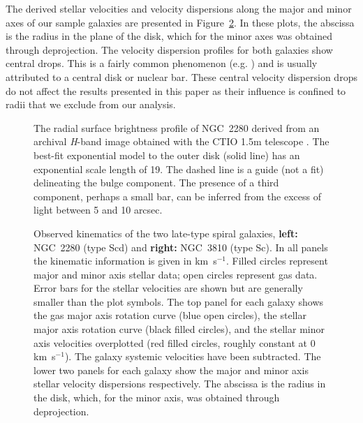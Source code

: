 \documentclass[useAMS,usenatbib]{mn2e}
\newcommand{\kms}{km~s$^{-1}$}
\begin{document}
The derived stellar velocities and velocity dispersions along the
major and minor axes of our sample galaxies are presented in
Figure~\ref{f:fig2}.  In these plots, the abscissa is the radius in
the plane of the disk, which for the minor axes was obtained through
deprojection.  The velocity dispersion profiles for both galaxies show
central drops.  This is a fairly common phenomenon
(e.g. \citealt{Comeron2008}) and is usually attributed to a central disk or
nuclear bar.  These central velocity dispersion drops do not affect
the results presented in this paper as their influence is confined to
radii that we exclude from our analysis.

\begin{figure}
   \centerline{}
   \caption{ The radial surface brightness profile of NGC~2280 derived
     from an archival {\it H}-band image obtained with the CTIO 1.5m
     telescope \citep{Eskridge2002}.  The best-fit exponential model to
     the outer disk (solid line) has an exponential scale length of
     19\arcsec. The dashed line is a guide (not a fit) delineating the
     bulge component. The presence of a third component, perhaps a small
     bar, can be inferred from the excess of light between 5 and 10
     arcsec.
\label{f:fig1}}
\end{figure}

\begin{figure}
   \centerline{}
   \caption{Observed kinematics of the two late-type spiral galaxies,
     {\bf left:} NGC~2280 (type Scd) and {\bf right:} NGC~3810 (type
     Sc).  In all panels the kinematic information is given in \kms.
     Filled circles represent major and minor axis stellar data; open
     circles represent gas data.  Error bars for the stellar velocities
     are shown but are generally smaller than the plot symbols.  The top
     panel for each galaxy shows the gas major axis rotation curve (blue
     open circles), the stellar major axis rotation curve (black filled
     circles), and the stellar minor axis velocities overplotted (red
     filled circles, roughly constant at 0 \kms).  The galaxy systemic
     velocities have been subtracted.  The lower two panels for each
     galaxy show the major and minor axis stellar velocity dispersions
     respectively.  The abscissa is the radius in the disk, which, for
     the minor axis, was obtained through deprojection.
   \label{f:fig2}}
\end{figure}
\end{document}
